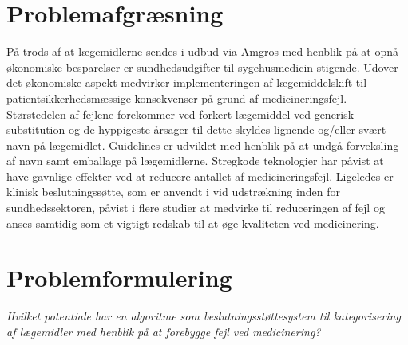 \section{Problemafgræsning}
På trods af at lægemidlerne sendes i udbud via Amgros med henblik på at opnå økonomiske besparelser er sundhedsudgifter til sygehusmedicin stigende. Udover det økonomiske aspekt medvirker implementeringen af lægemiddelskift til patientsikkerhedsmæssige konsekvenser på grund af medicineringsfejl. Størstedelen af fejlene forekommer ved forkert lægemiddel ved generisk substitution og de hyppigeste årsager til dette skyldes lignende og/eller svært navn på lægemidlet. Guidelines er udviklet med henblik på at undgå forveksling af navn samt emballage på lægemidlerne. Stregkode teknologier har påvist at have gavnlige effekter ved at reducere antallet af medicineringsfejl. Ligeledes er klinisk beslutningssøtte, som er anvendt i vid udstrækning inden for sundhedssektoren, påvist i flere studier at medvirke til reduceringen af fejl og anses samtidig som et vigtigt redskab til at øge kvaliteten ved medicinering.

\section{Problemformulering}
\textit{Hvilket potentiale har en algoritme som beslutningsstøttesystem til kategorisering af lægemidler med henblik på at forebygge fejl ved medicinering?}
